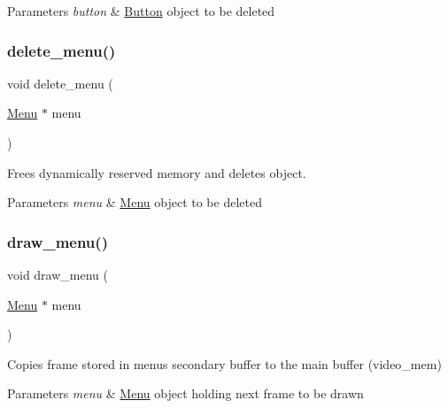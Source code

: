 \begin{DoxyParams}{Parameters}
{\em button} & \hyperlink{struct_button}{Button} \textquotesingle{}object\textquotesingle{} to be deleted \\
\hline
\end{DoxyParams}
\hypertarget{group__menu_gacd664c37e26bab0e115dc3e1e3d3f3e2}{}\label{group__menu_gacd664c37e26bab0e115dc3e1e3d3f3e2} 
\subsubsection{\texorpdfstring{delete\+\_\+menu()}{delete\_menu()}}
{\footnotesize\ttfamily void delete\+\_\+menu (\begin{DoxyParamCaption}\item[{\hyperlink{struct_menu}{Menu} $\ast$}]{menu }\end{DoxyParamCaption})}



Frees dynamically reserved memory and deletes \textquotesingle{}object\textquotesingle{}. 


\begin{DoxyParams}{Parameters}
{\em menu} & \hyperlink{struct_menu}{Menu} \textquotesingle{}object\textquotesingle{} to be deleted \\
\hline
\end{DoxyParams}
\hypertarget{group__menu_gabd716dc598e19aa573308e960c00cec1}{}\label{group__menu_gabd716dc598e19aa573308e960c00cec1} 
\subsubsection{\texorpdfstring{draw\+\_\+menu()}{draw\_menu()}}
{\footnotesize\ttfamily void draw\+\_\+menu (\begin{DoxyParamCaption}\item[{\hyperlink{struct_menu}{Menu} $\ast$}]{menu }\end{DoxyParamCaption})}



Copies frame stored in menu\textquotesingle{}s secondary buffer to the main buffer (video\+\_\+mem) 


\begin{DoxyParams}{Parameters}
{\em menu} & \hyperlink{struct_menu}{Menu} \textquotesingle{}object\textquotesingle{} holding next frame to be drawn \\
\hline
\end{DoxyParams}
\hypertarget{group__menu_ga137aca34f09e40a031dc463eab8d2050}{}\label{group__menu_ga137aca34f09e40a031dc463eab8d2050} 
